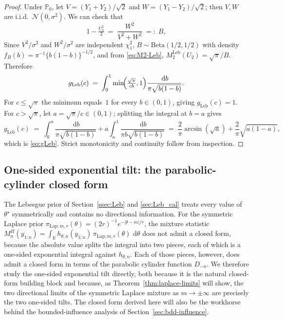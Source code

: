 \documentclass[12pt, a4paper]{report}
\newcommand{\Prob}{\mathbb{P}}
\newcommand{\dd}{\,\mathrm{d}}
\newcommand{\Leb}{\mathrm{Leb}}
\newcommand{\1}{\mathbf{1}}
\begin{document}
\begin{proof}
    Under \(\Prob_0\), let \(V=(Y_1+Y_2)/\sqrt 2\) and
\(W=(Y_1-Y_2)/\sqrt 2\); then \(V,W\) are i.i.d.\
\(\mathcal N(0,\sigma^2)\). We can check that
\[
   1-\tfrac{U_2^2}{2}\;=\;\frac{W^2}{V^2+W^2}\;=:\;B,
\]
Since $V^2/\sigma^2$ and $W^2/\sigma^2$ are independent $\chi_1^2$, \(B\sim\mathrm{Beta}(1/2,1/2)\) with density
\(f_B(b)=\pi^{-1}\{b(1-b)\}^{-1/2}\), and from \eqref{eq:M2-Leb},
\(M_2^{\Leb}(U_2)=\sqrt\pi/B\). Therefore
\[
  g_{\Leb}(c)
  \;=\;\int_0^1\min\!\Bigl(\tfrac{\sqrt\pi}{cb},1\Bigr)
       \frac{\dd b}{\pi\sqrt{b(1-b)}}.
\]
For \(c\leq\sqrt\pi\) the minimum equals~\(1\) for every
\(b\in(0,1)\), giving \(g_{\Leb}(c)=1\). For \(c>\sqrt\pi\), let
\(a=\sqrt\pi/c\in(0,1)\); splitting the integral at \(b=a\) gives
\[
  g_{\Leb}(c)\;=\;
  \int_0^a\frac{\dd b}{\pi\sqrt{b(1-b)}}
  +a\int_a^1\frac{\dd b}{\pi b\sqrt{b(1-b)}}
  \;=\;\frac{2}{\pi}\arcsin(\sqrt a)+\frac{2}{\pi}\sqrt{a(1-a)},
\]
which is \eqref{eq:gLeb}. Strict monotonicity and continuity follow
from inspection.
\end{proof}

\subsection{One-sided exponential tilt: the parabolic-cylinder closed form}
\label{sec:exptilt}

The Lebesgue prior of Section~\ref{ssec:Leb} and \ref{sec:Leb_cal} treats every value of $\theta^\star$ symmetrically and contains no directional information. For the symmetric Laplace prior $\pi_{\mathrm{Lap};m,r}(\theta) =(2r)^{-1}e^{-|\theta-m|/r}$, the mixture statistic $M_n^{\Pi}(y_{1:n})=\int_\mathbb{R} h_{\theta,n}(y_{1:n})\,\pi_{\mathrm{Lap};m,r}(\theta)\,\dd\theta$
does not admit a closed form, because the absolute value splits the integral into two pieces, each of which is a one-sided exponential integral against $h_{\theta,n}$. Each of those pieces, however, does admit a closed form in terms of the parabolic cylinder
function $D_{-n}$. We therefore study the one-sided exponential tilt directly, both because it is the natural closed-form building block and because, as Theorem~\ref{thm:laplace-limits} will show, the two
directional limits of the symmetric Laplace mixture as $m\to\pm\infty$ are precisely the two one-sided tilts. The closed form derived here will also be the workhorse behind the bounded-influence analysis of
Section~\ref{sec:bdd-influence}.
\end{document}
